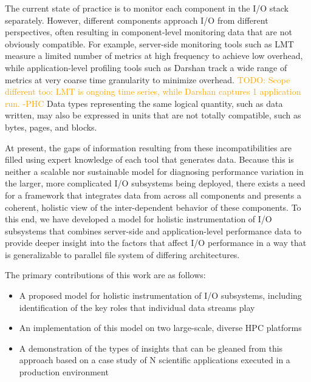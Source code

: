 \documentclass[conference,10pt,compsocconf]{IEEEtran}
\newcommand{\todo}[1]{\textcolor{Orange}{TODO: #1}}
\begin{document}
The current state of practice is to monitor each component in the I/O stack
separately.  However, different components approach I/O from different
perspectives, often resulting in component-level monitoring data that are not
obviously compatible.  For example, server-side monitoring tools such as
LMT\cite{lmt} measure a limited number of metrics at high frequency to achieve
low overhead, while application-level profiling tools such as
Darshan\cite{carns200924} track a wide range of metrics at very coarse time
granularity to minimize overhead.  \todo{Scope different too: LMT is ongoing
time series, while Darshan captures 1 application run. -PHC}
Data types representing the same logical
quantity, such as data written, may also be expressed in units that are not
totally compatible, such as bytes, pages, and blocks.


At present, the gaps of information resulting from these incompatibilities are
filled using expert knowledge of each tool that generates data.  Because this is
neither a scalable nor sustainable model for diagnosing performance variation in
the larger, more complicated I/O subsystems being deployed, there exists a need
for a framework that integrates data from across all components and presents a
coherent, holistic view of the inter-dependent behavior of these components.  To
this end, we have developed a model for holistic instrumentation of I/O
subsystems that combines server-side and application-level performance data to
provide deeper insight into the factors that affect I/O performance in a way
that is generalizable to parallel file system of differing architectures.


The primary contributions of this work are as follows:

\begin{itemize}
\item A proposed model for holistic instrumentation of I/O subsystems,
including identification of the key roles that individual data streams play
\item An implementation of this model on two large-scale, diverse HPC
platforms
\item A demonstration of the types of insights that can be gleaned from this
approach based on a case study of N scientific applications executed in a
production environment
\end{itemize}
\end{document}

